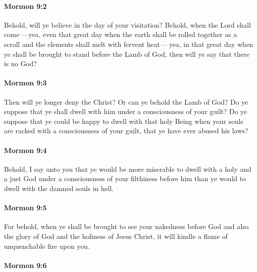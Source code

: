 		\paragraph{Mormon 9:2} %
			\label{MORMON-9-2}

			Behold, will ye believe in the day of your visitation?
			Behold, when the Lord shall come
			---yea, even that great day
			when the earth shall be rolled together as a scroll
			and the elements shall melt with fervent heat---
			yea, in that great day when ye shall be brought
			to stand before the Lamb of God,
			then will ye say that there is no God?

		\paragraph{Mormon 9:3} %
			\label{MORMON-9-3}

			Then will ye longer deny the Christ?
			Or can ye behold the Lamb of God?
			Do ye suppose that ye shall dwell with him
			under a consciousness of your guilt?
			Do ye suppose that ye could be happy to dwell with that holy Being
			when your souls are racked with a consciousness of your guilt,
			that ye have ever abused his laws?

		\paragraph{Mormon 9:4} %
			\label{MORMON-9-4}

			Behold, I say unto you
			that ye would be more miserable to dwell with a holy and a just God
			under a consciousness of your filthiness before him
			than ye would to dwell with the damned souls in hell.

		\paragraph{Mormon 9:5} %
			\label{MORMON-9-5}

			For behold, when ye shall be brought to see your nakedness before God
			and also the glory of God and the holiness of Jesus Christ,
			it will kindle a flame of unquenchable fire upon you.

		\paragraph{Mormon 9:6} %
			\label{MORMON-9-6}

